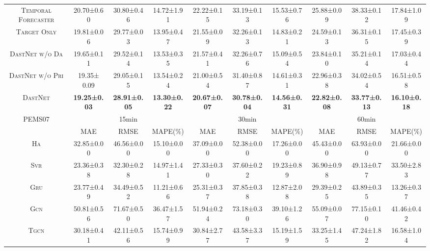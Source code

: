 \documentclass[sigconf]{acmart}
\theoremstyle{definition}
\begin{document}
\begin{table*}[t]
{\begin{tabular}{c||ccc|ccc|ccc}
\arrayrulecolor{black!30}\midrule
\textsc{Temporal Forecaster}     & 20.70±0.60  & 30.80±0.46  & 14.72±1.91  & 22.22±0.15  & 33.19±0.13  & 15.53±0.76  & 25.88±0.09  & 38.33±0.12  & 17.84±1.09 \\
\textsc{Target Only}   & 19.81±0.06  & 29.77±0.03  & 13.95±0.47  & 21.55±0.09  & 32.26±0.13  & 14.83±0.21  & 24.59±0.13  & 36.31±0.15  & 17.45±0.39 \\
\textsc{DastNet w/o Da}         & 19.65±0.11  & 29.52±0.14  & 13.53±0.35  & 21.57±0.41  & 32.26±0.76  & 15.09±0.54  & 23.84±0.10  & 35.21±0.14  & 17.03±0.44 \\
\textsc{DastNet w/o Pri}        & 19.35± 0.09 & 29.05±0.15  & 13.54±0.24  & 21.00±0.54  & 31.40±0.87  & 14.61±0.31  & 22.96±0.38  & 34.02±0.54  & 16.51±0.58 \\
\textsc{DastNet}                  & \textbf{19.25±0.03}  & \textbf{28.91±0.05}  & \textbf{13.30±0.22}  & \textbf{20.67±0.07}  & \textbf{30.78±0.04}  & \textbf{14.56±0.31}  & \textbf{22.82±0.08}  & \textbf{33.77±0.13}  & \textbf{16.10±0.18} \\ \hline\hline
\multirow{2}{*}{PEMS07} & \multicolumn{3}{c|}{15min}                                                         & \multicolumn{3}{c|}{30min}                                                         & \multicolumn{3}{c}{60min}                                                         \\ \cline{2-10}
                       & \multicolumn{1}{c}{MAE} & \multicolumn{1}{c}{RMSE} & \multicolumn{1}{c|}{MAPE(\%)} & \multicolumn{1}{c}{MAE} & \multicolumn{1}{c}{RMSE} & \multicolumn{1}{c|}{MAPE(\%)} & \multicolumn{1}{c}{MAE} & \multicolumn{1}{c}{RMSE} & \multicolumn{1}{c}{MAPE(\%)} \\ \hline
\textsc{Ha}                     & 32.85±0.00  & 46.56±0.00  & 15.10±0.00  & 37.09±0.00  & 52.38±0.00  & 17.26±0.00  & 45.43±0.00  & 63.93±0.00  & 21.66±0.00 \\
\textsc{Svr}                    & 23.36±0.38  & 32.30±0.28  & 14.97±1.41  & 27.33±0.30  & 37.60±0.22  & 19.23±0.89  & 36.90±0.98  & 49.13±0.77  & 33.50±2.83 \\
\textsc{Gru}                    & 23.77±0.49  & 34.49±0.52  & 11.21±0.66  & 25.31±0.37  & 37.85±0.38  & 12.87±2.08  & 29.39±0.25  & 43.89±0.35  & 13.26±0.37 \\
\textsc{Gcn}                    & 50.81±0.56  & 71.67±0.50  & 36.47±1.57  & 51.94±0.24  & 73.18±0.30  & 39.10±1.26  & 55.09±0.07  & 77.15±0.10  & 41.46±0.42 \\
\textsc{Tgcn}                   & 30.18±0.41  & 42.11±0.56  & 15.74±0.99  & 30.84±2.77  & 43.58±3.37  & 15.19±1.59  & 33.25±1.45  & 47.24±1.82  & 16.58±1.04 \\

\end{tabular}}
\end{table*}
\end{document}
